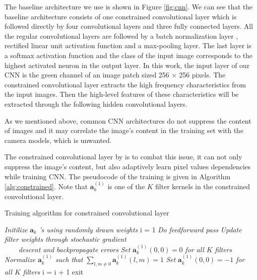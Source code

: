\documentclass[a4paper, 9pt, twocolumn]{extarticle}
\begin{document}
The baseline architecture we use is shown in Figure \ref{fig:cnn}. We can see that the baseline architecture consists of one constrained convolutional layer which is followed directly by four convolutional layers and three fully connected layers. All the regular convolutional layers are followed by a batch normalization layer \cite{ioffe2015batch}, rectified linear unit activation function \cite{nair2010rectified} and a max-pooling layer. The last layer is a softmax activation function and the class of the input image corresponds to the highest activated neuron in the output layer. In this work, the input layer of our CNN is the green channel of an image patch sized 256 $ \times $ 256 pixels. The constrained convolutional layer extracts the high frequency characteristics from the input images. Then the high-level features of these characteristics will be extracted through the following hidden convolutional layers.

As we mentioned above, common CNN architectures do not suppress the content of images and it may correlate the image's content in the training set with the camera models, which is unwanted. 

The constrained convolutional layer by \citet{10.1145/2909827.2930786} is to combat this issue, it can not only suppress the image's content, but also adaptively learn pixel values dependencies while training CNN. The pseudocode of the training is given in Algorithm \ref{alg:constrained}. Note that $ \bm{a}_k^{(1)} $ is one of the $ K $ filter kernels in the constrained convolutional layer.

\begin{algorithm} 
	\caption{Training algorithm for constrained convolutional layer}
	\label{alg:constrained}
	\begin{algorithmic}[1]
		\State \textit{Initilize} $ \bm{a}_k $ \textit{’s using randomly drawn weights}
		\State i = 1
		\State \textit{Do feedforward pass}
		\State \textit{Update filter weights through stochastic gradient \\ 
			\ \ \ \ descent and backpropagate errors}
		\State \textit{Set $ \bm{a}_k^{(1)}(0, 0) = 0 $ for all $ K $ filters}
		\State \textit{Normalize $ \bm{a}_k^{(1)} $ such that $ \sum_{l,m \neq 0} \bm{a}_k^{(1)}(l, m) = 1 $ }
		\State \textit{Set $ \bm{a}_k^{(1)}(0, 0) = -1 $ for all $ K $ filters}
		i = i + 1
			\State exit
		\EndIf
		\EndWhile
	\end{algorithmic}
\end{algorithm}
\end{document}
